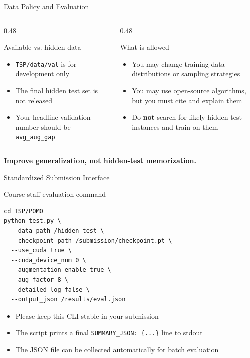 \documentclass[aspectratio=169,11pt]{beamer}
\begin{document}
\begin{frame}{Data Policy and Evaluation}
  \begin{columns}[T,totalwidth=\textwidth]
    \begin{column}{0.48\textwidth}
      \begin{block}{Available vs. hidden data}
        \begin{itemize}
          \item \texttt{TSP/data/val} is for development only
          \item The final hidden test set is not released
          \item Your headline validation number should be \texttt{avg\_aug\_gap}
        \end{itemize}
      \end{block}
    \end{column}
    \begin{column}{0.48\textwidth}
      \begin{alertblock}{What is allowed}
        \begin{itemize}
          \item You may change training-data distributions or sampling strategies
          \item You may use open-source algorithms, but you must cite and explain them
          \item Do \textbf{not} search for likely hidden-test instances and train on them
        \end{itemize}
      \end{alertblock}
    \end{column}
  \end{columns}

  \vspace{0.4cm}
  \centering
  {\Large\color{sdmorange}\textbf{Improve generalization, not hidden-test memorization.}}
\end{frame}

\begin{frame}[fragile]{Standardized Submission Interface}
  \begin{block}{Course-staff evaluation command}
\begin{lstlisting}
cd TSP/POMO
python test.py \
  --data_path /hidden_test \
  --checkpoint_path /submission/checkpoint.pt \
  --use_cuda true \
  --cuda_device_num 0 \
  --augmentation_enable true \
  --aug_factor 8 \
  --detailed_log false \
  --output_json /results/eval.json
\end{lstlisting}
  \end{block}

  \begin{itemize}
    \item Please keep this CLI stable in your submission
    \item The script prints a final \texttt{SUMMARY\_JSON: \{...\}} line to stdout
    \item The JSON file can be collected automatically for batch evaluation
  \end{itemize}
\end{frame}
\end{document}
